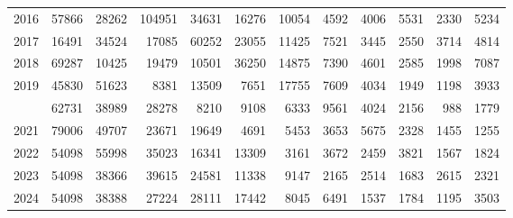 \documentclass[
]{article}
\begin{document}
\begin{longtable}[t]{lrrrrrrrrrrr}
2016 & 57866 & 28262 & 104951 & 34631 & 16276 & 10054 & 4592 & 4006 & 5531 & 2330 & 5234\\
2017 & 16491 & 34524 & 17085 & 60252 & 23055 & 11425 & 7521 & 3445 & 2550 & 3714 & 4814\\
2018 & 69287 & 10425 & 19479 & 10501 & 36250 & 14875 & 7390 & 4601 & 2585 & 1998 & 7087\\
2019 & 45830 & 51623 & 8381 & 13509 & 7651 & 17755 & 7609 & 4034 & 1949 & 1198 & 3933\\
\addlinespace
2020 & 62731 & 38989 & 28278 & 8210 & 9108 & 6333 & 9561 & 4024 & 2156 & 988 & 1779\\
2021 & 79006 & 49707 & 23671 & 19649 & 4691 & 5453 & 3653 & 5675 & 2328 & 1455 & 1255\\
2022 & 54098 & 55998 & 35023 & 16341 & 13309 & 3161 & 3672 & 2459 & 3821 & 1567 & 1824\\
2023 & 54098 & 38366 & 39615 & 24581 & 11338 & 9147 & 2165 & 2514 & 1683 & 2615 & 2321\\
2024 & 54098 & 38388 & 27224 & 28111 & 17442 & 8045 & 6491 & 1537 & 1784 & 1195 & 3503\\*
\end{longtable}
\end{document}
